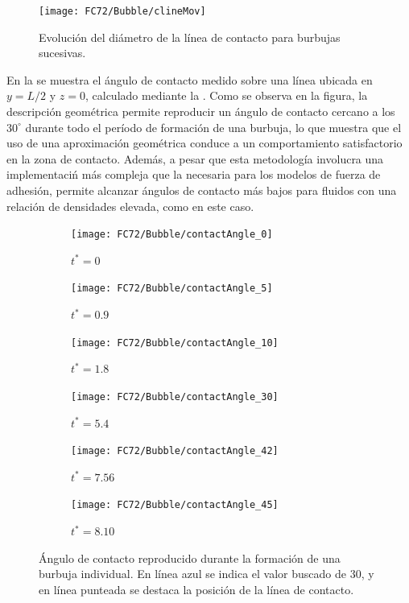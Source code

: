 \begin{figure}[ht]
	\centering
	\texttt{[image: FC72/Bubble/clineMov]}
	\caption{Evoluci\'on del di\'ametro de la l\'inea de contacto para burbujas sucesivas.}
	\label{fig:linea_contacto}
\end{figure}
\FloatBarrier

En la  se muestra el \'angulo de contacto medido sobre una l\'inea ubicada en $y=L/2$ y $z=0$, calculado mediante la . Como se observa en la figura, la descripci\'on geom\'etrica permite reproducir un \'angulo de contacto cercano a los $30^{\circ}$ durante todo el per\'iodo de formaci\'on de una burbuja, lo que muestra que el uso de una aproximaci\'on geom\'etrica conduce a un comportamiento satisfactorio en la zona de contacto. Adem\'as, a pesar que esta metodolog\'ia involucra una implementaci\'n m\'as compleja que la necesaria para los modelos de fuerza de adhesi\'on, permite alcanzar \'angulos de contacto m\'as bajos para fluidos con una relaci\'on de densidades elevada, como en este caso.

\begin{figure}[htb]
    \centering
    \begin{subfigure}[t]{0.45\textwidth}
        \centering
        \texttt{[image: FC72/Bubble/contactAngle\_0]}
        \caption{$t^*=0$}
    \end{subfigure}
    \vspace{3mm}
    \begin{subfigure}[t]{0.45\textwidth}
        \centering
        \texttt{[image: FC72/Bubble/contactAngle\_5]}
        \caption{$t^*=0.9$}
    \end{subfigure}
    \begin{subfigure}[t]{0.45\textwidth}
        \centering
        \texttt{[image: FC72/Bubble/contactAngle\_10]}
        \caption{$t^*=1.8$}
    \end{subfigure}
    \vspace{3mm}    
    \begin{subfigure}[t]{0.45\textwidth}
        \centering
        \texttt{[image: FC72/Bubble/contactAngle\_30]}
        \caption{$t^*=5.4$}
    \end{subfigure}
    \begin{subfigure}[t]{0.45\textwidth}
        \centering
        \texttt{[image: FC72/Bubble/contactAngle\_42]}
        \caption{$t^*=7.56$}
    \end{subfigure}
    \begin{subfigure}[t]{0.45\textwidth}
        \centering
        \texttt{[image: FC72/Bubble/contactAngle\_45]}
        \caption{$t^*=8.10$}
    \end{subfigure}            
    \caption{\'Angulo de contacto reproducido durante la formaci\'on de una burbuja individual. En l\'inea azul se indica el valor buscado de $30$\textordmasculine, y en l\'inea punteada se destaca la posici\'on de la l\'inea de contacto.}
    \label{fig:evolucion_contacto}
\end{figure}
\FloatBarrier 

